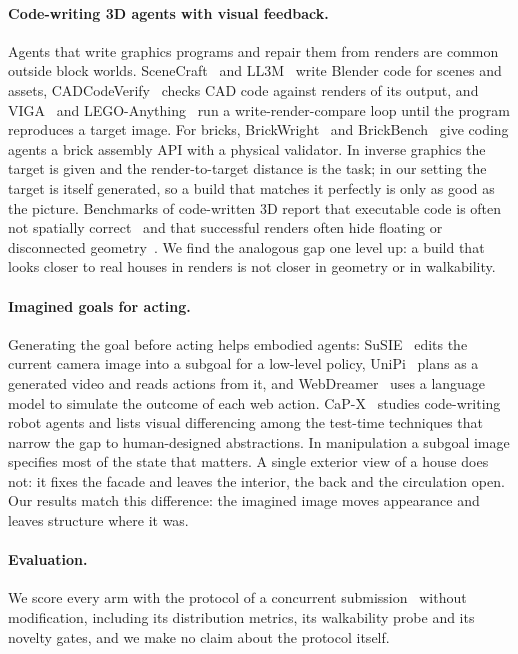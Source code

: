 \paragraph{Code-writing 3D agents with visual feedback.}
Agents that write graphics programs and repair them from renders are common outside block worlds.
SceneCraft~\citep{hu2024scenecraft} and LL3M~\citep{lu2025ll3m} write Blender code for scenes and
assets, CADCodeVerify~\citep{alrashedy2025cadcodeverify} checks CAD code against renders of its
output, and VIGA~\citep{yin2026viga} and LEGO-Anything~\citep{li2026legoanything} run a
write-render-compare loop until the program reproduces a target image. For bricks,
BrickWright~\citep{pun2026brickwright} and BrickBench~\citep{kulits2026brickbench} give coding
agents a brick assembly API with a physical validator. In inverse graphics the target is given and
the render-to-target distance is the task; in our setting the target is itself generated, so a
build that matches it perfectly is only as good as the picture. Benchmarks of code-written 3D
report that executable code is often not spatially correct~\citep{zheng2026voxelcodebench} and that
successful renders often hide floating or disconnected geometry~\citep{gao2026threedcodebench}. We
find the analogous gap one level up: a build that looks closer to real houses in renders is not
closer in geometry or in walkability.

\paragraph{Imagined goals for acting.}
Generating the goal before acting helps embodied agents: SuSIE~\citep{black2024susie} edits the
current camera image into a subgoal for a low-level policy, UniPi~\citep{du2023unipi} plans as a
generated video and reads actions from it, and WebDreamer~\citep{gu2024webdreamer} uses a language
model to simulate the outcome of each web action. CaP-X~\citep{fu2026capx} studies code-writing robot
agents and lists visual differencing among the test-time techniques that narrow the gap to human-designed
abstractions. In manipulation a subgoal image specifies most of the state that matters. A single
exterior view of a house does not: it fixes the facade and leaves the interior, the back and the
circulation open. Our results match this difference: the imagined image moves appearance and leaves
structure where it was.

\paragraph{Evaluation.}
We score every arm with the protocol of a concurrent submission~\citep{anonymous2027blindness}
without modification, including its distribution metrics, its walkability probe and its novelty
gates, and we make no claim about the protocol itself.
